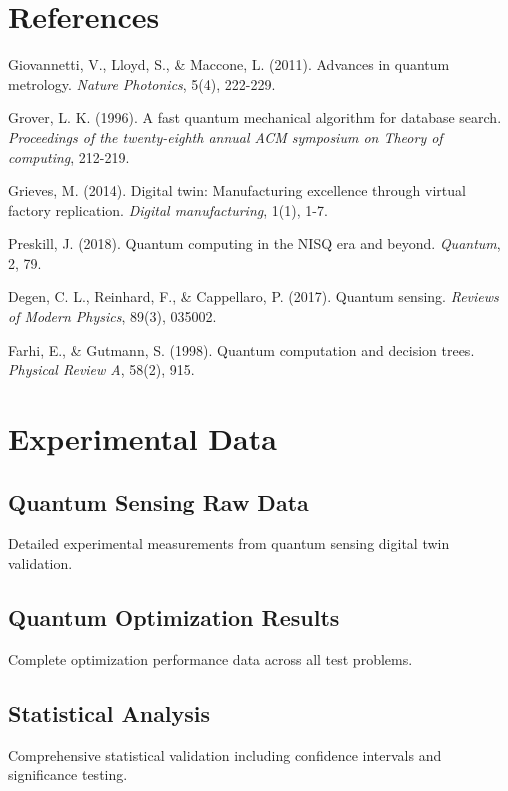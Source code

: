 \documentclass[12pt,a4paper]{report}
\begin{document}
\chapter*{References}

\begin{thebibliography}{99}

Giovannetti, V., Lloyd, S., \& Maccone, L. (2011). Advances in quantum metrology. \textit{Nature Photonics}, 5(4), 222-229.

Grover, L. K. (1996). A fast quantum mechanical algorithm for database search. \textit{Proceedings of the twenty-eighth annual ACM symposium on Theory of computing}, 212-219.

Grieves, M. (2014). Digital twin: Manufacturing excellence through virtual factory replication. \textit{Digital manufacturing}, 1(1), 1-7.

Preskill, J. (2018). Quantum computing in the NISQ era and beyond. \textit{Quantum}, 2, 79.

Degen, C. L., Reinhard, F., \& Cappellaro, P. (2017). Quantum sensing. \textit{Reviews of Modern Physics}, 89(3), 035002.

Farhi, E., \& Gutmann, S. (1998). Quantum computation and decision trees. \textit{Physical Review A}, 58(2), 915.

\end{thebibliography}

\appendix

\chapter{Experimental Data}

\section{Quantum Sensing Raw Data}

Detailed experimental measurements from quantum sensing digital twin validation.

\section{Quantum Optimization Results}

Complete optimization performance data across all test problems.

\section{Statistical Analysis}

Comprehensive statistical validation including confidence intervals and significance testing.
\end{document}

